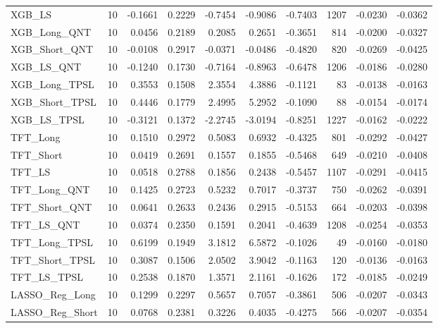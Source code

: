 \begin{tabular}{llrrrrrrrr}
\cline{1-10}
XGB\_LS & 10 & -0.1661 & 0.2229 & -0.7454 & -0.9086 & -0.7403 & 1207 & -0.0230 & -0.0362 \\
\cline{1-10}
XGB\_Long\_QNT & 10 & 0.0456 & 0.2189 & 0.2085 & 0.2651 & -0.3651 & 814 & -0.0200 & -0.0327 \\
\cline{1-10}
XGB\_Short\_QNT & 10 & -0.0108 & 0.2917 & -0.0371 & -0.0486 & -0.4820 & 820 & -0.0269 & -0.0425 \\
\cline{1-10}
XGB\_LS\_QNT & 10 & -0.1240 & 0.1730 & -0.7164 & -0.8963 & -0.6478 & 1206 & -0.0186 & -0.0280 \\
\cline{1-10}
XGB\_Long\_TPSL & 10 & 0.3553 & 0.1508 & 2.3554 & 4.3886 & -0.1121 & 83 & -0.0138 & -0.0163 \\
\cline{1-10}
XGB\_Short\_TPSL & 10 & 0.4446 & 0.1779 & 2.4995 & 5.2952 & -0.1090 & 88 & -0.0154 & -0.0174 \\
\cline{1-10}
XGB\_LS\_TPSL & 10 & -0.3121 & 0.1372 & -2.2745 & -3.0194 & -0.8251 & 1227 & -0.0162 & -0.0222 \\
\cline{1-10}
TFT\_Long & 10 & 0.1510 & 0.2972 & 0.5083 & 0.6932 & -0.4325 & 801 & -0.0292 & -0.0427 \\
\cline{1-10}
TFT\_Short & 10 & 0.0419 & 0.2691 & 0.1557 & 0.1855 & -0.5468 & 649 & -0.0210 & -0.0408 \\
\cline{1-10}
TFT\_LS & 10 & 0.0518 & 0.2788 & 0.1856 & 0.2438 & -0.5457 & 1107 & -0.0291 & -0.0415 \\
\cline{1-10}
TFT\_Long\_QNT & 10 & 0.1425 & 0.2723 & 0.5232 & 0.7017 & -0.3737 & 750 & -0.0262 & -0.0391 \\
\cline{1-10}
TFT\_Short\_QNT & 10 & 0.0641 & 0.2633 & 0.2436 & 0.2915 & -0.5153 & 664 & -0.0203 & -0.0398 \\
\cline{1-10}
TFT\_LS\_QNT & 10 & 0.0374 & 0.2350 & 0.1591 & 0.2041 & -0.4639 & 1208 & -0.0254 & -0.0353 \\
\cline{1-10}
TFT\_Long\_TPSL & 10 & 0.6199 & 0.1949 & 3.1812 & 6.5872 & -0.1026 & 49 & -0.0160 & -0.0180 \\
\cline{1-10}
TFT\_Short\_TPSL & 10 & 0.3087 & 0.1506 & 2.0502 & 3.9042 & -0.1163 & 120 & -0.0136 & -0.0163 \\
\cline{1-10}
TFT\_LS\_TPSL & 10 & 0.2538 & 0.1870 & 1.3571 & 2.1161 & -0.1626 & 172 & -0.0185 & -0.0249 \\
\cline{1-10}
LASSO\_Reg\_Long & 10 & 0.1299 & 0.2297 & 0.5657 & 0.7057 & -0.3861 & 506 & -0.0207 & -0.0343 \\
\cline{1-10}
LASSO\_Reg\_Short & 10 & 0.0768 & 0.2381 & 0.3226 & 0.4035 & -0.4275 & 566 & -0.0207 & -0.0354 \\

\end{tabular}
